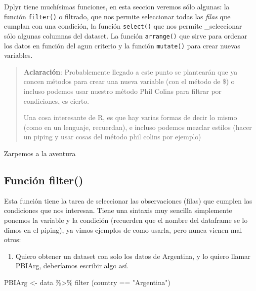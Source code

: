\documentclass[
]{book}
\newenvironment{Shaded}{\begin{snugshade}}{\end{snugshade}}
\newcommand{\FunctionTok}[1]{\textcolor[rgb]{0.00,0.00,0.00}{#1}}
\newcommand{\NormalTok}[1]{#1}
\newcommand{\OtherTok}[1]{\textcolor[rgb]{0.56,0.35,0.01}{#1}}
\newcommand{\SpecialCharTok}[1]{\textcolor[rgb]{0.00,0.00,0.00}{#1}}
\newcommand{\StringTok}[1]{\textcolor[rgb]{0.31,0.60,0.02}{#1}}
\providecommand{\tightlist}{%
  \setlength{\itemsep}{0pt}\setlength{\parskip}{0pt}}
\begin{document}
Dplyr tiene muchísimas funciones, en esta seccion veremos sólo algunas: la función \texttt{filter()} o filtrado, que nos permite seleccionar todas las \emph{filas} que cumplan con una condición, la función \texttt{select()} que nos permite \_seleccionar sólo algunas columnas del dataset. La función \texttt{arrange()} que sirve para ordenar los datos en función del agun criterio y la función \texttt{mutate()} para crear nuevas variables.

\begin{quote}
\textbf{Aclaración}: Probablemente llegado a este punto se plantearán que ya concen métodos para crear una nueva variable (con el método de \$) o incluso podemos usar nuestro método Phil Colins para filtrar por condiciones, es cierto.

Una cosa interesante de R, es que hay varias formas de decir lo mismo (como en un lenguaje, recuerdan), e incluso podemos mezclar estilos (hacer un piping y usar cosas del método phil colins por ejemplo)
\end{quote}

Zarpemos a la aventura

\hypertarget{funciuxf3n-filter}{%
\subsection{Función filter()}\label{funciuxf3n-filter}}

Esta función tiene la tarea de seleccionar las observaciones (filas) que cumplen las condiciones que nos interesan.
Tiene una sintaxis muy sencilla simplemente ponemos la variable y la condición (recuerden que el nombre del dataframe se lo dimos en el piping), ya vimos ejemplos de como usarla, pero nunca vienen mal otros:

\begin{enumerate}
\def\labelenumi{\arabic{enumi}.}
\tightlist
\item
  Quiero obtener un dataset con solo los datos de Argentina, y lo quiero llamar PBIArg, deberíamos escribir algo así.
\end{enumerate}

\begin{Shaded}
\begin{Highlighting}[]
\NormalTok{ PBIArg }\OtherTok{\textless{}{-}}\NormalTok{ data }\SpecialCharTok{\%\textgreater{}\%} \FunctionTok{filter}\NormalTok{ (country }\SpecialCharTok{==} \StringTok{"Argentina"}\NormalTok{)}
\end{Highlighting}
\end{Shaded}
\end{document}
